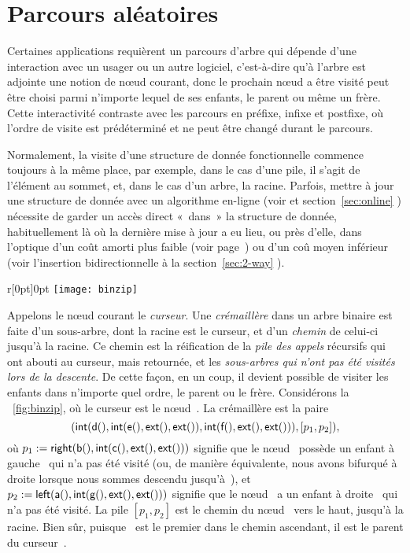 \section{Parcours aléatoires}

Certaines applications requièrent un parcours d'arbre qui dépende
d'une interaction avec un usager ou un autre logiciel, c'est-à-dire
qu'à l'arbre est adjointe une notion de n{\oe}ud courant, donc le
prochain n{\oe}ud a être visité peut être choisi parmi n'importe
lequel de ses enfants, le parent ou même un frère. Cette interactivité
contraste avec les parcours en préfixe, infixe et postfixe, où l'ordre
de visite est prédéterminé et ne peut être changé durant le parcours.

Normalement, la visite d'une structure de donnée fonctionnelle
commence toujours à la même place, par exemple, dans le cas d'une
pile, il s'agit de l'élément au sommet, et, dans le cas d'un arbre, la
racine. Parfois, mettre à jour une structure de donnée avec un
algorithme en-ligne (voir  et
section~\ref{sec:online} ) nécessite de garder un
accès direct «~dans~» la structure de donnée, habituellement là où la
dernière mise à jour a eu lieu, ou près d'elle, dans l'optique d'un
coût amorti plus faible (voir page~\pageref{par:amortised_cost}) ou
d'un coû moyen inférieur (voir l'insertion bidirectionnelle à la
section~\ref{sec:2-way} ).

\begin{wrapfigure}[7]{r}[0pt]{0pt}
\centering
\texttt{[image: binzip]}
\caption{\label{fig:binzip}}
\end{wrapfigure}
Appelons le n{\oe}ud courant le \emph{curseur}. Une \emph{crémaillère} dans un arbre binaire est faite d'un
sous-arbre, dont la racine est le curseur, et d'un \emph{chemin} de
celui-ci jusqu'à la racine. Ce chemin est la réification de la
\emph{pile des appels}
récursifs qui ont abouti au curseur, mais retournée, et les
\emph{sous-arbres qui n'ont pas été visités lors de la descente}.  De
cette façon, en un coup, il devient possible de visiter les enfants
dans n'importe quel ordre, le parent ou le frère. Considérons la
\fig~\ref{fig:binzip}, où le curseur est le n{\oe}ud~. La
crémaillère est la paire
\begin{equation*}
\pair{\fun{int}(\fun{d}(),\fun{int}(\fun{e}(),\fun{ext}(),\fun{ext}()),
\fun{int}(\fun{f}(),\fun{ext}(),\fun{ext}()))}%
{[p_1,p_2]},
\end{equation*}
où \(p_1 := \textsf{right}(\textsf{b}(), \textsf{int}(\textsf{c}(), \textsf{ext}(),
\textsf{ext}()))\) signifie que le n{\oe}ud~ possède un enfant à
gauche~ qui n'a pas été visité (ou, de manière équivalente,
nous avons bifurqué à droite lorsque nous sommes descendu
jusqu'à~), et \(p_2 := \textsf{left}(\textsf{a}(),
\textsf{int}(\textsf{g}(), \textsf{ext}(), \textsf{ext}()))\) signifie que le
n{\oe}ud~ a un enfant à droite~ qui n'a pas été
visité. La pile \([p_1,p_2]\) est le chemin du n{\oe}ud~ vers
le haut, jusqu'à la racine. Bien sûr, puisque ~est le premier
dans le chemin ascendant, il est le parent du curseur~.

